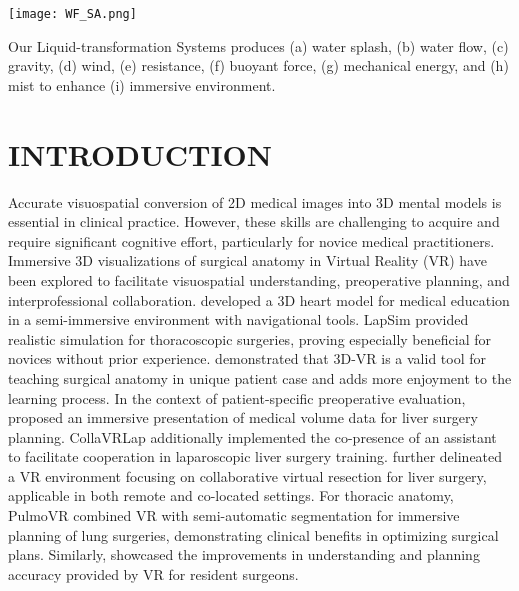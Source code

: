 \documentclass[manuscript]{acmart} %
\begin{document}

\begin{teaserfigure}
  \texttt{[image: WF\_SA.png]}
  \vspace{-1.75em}
  \caption{Our Liquid-transformation Systems produces (a) water splash, (b) water flow, (c) gravity, (d) wind,  (e) resistance, (f) buoyant force, (g) mechanical energy, and (h) mist to enhance (i) immersive environment.}
  \vspace{0.5em}
  \Description{}
  \label{fig:teaser}
\end{teaserfigure}

\maketitle

\section{INTRODUCTION}
Accurate visuospatial conversion of 2D medical images into 3D mental models is essential in clinical practice. However, these skills are challenging to acquire and require significant cognitive effort, particularly for novice medical practitioners. Immersive 3D visualizations of surgical anatomy in Virtual Reality (VR) have been explored to facilitate visuospatial understanding, preoperative planning, and interprofessional collaboration. \cite{RN86} developed a 3D heart model for medical education in a semi-immersive environment with navigational tools. LapSim \cite{RN90} provided realistic simulation for thoracoscopic surgeries, proving especially beneficial for novices without prior experience. \cite{RN95} demonstrated that 3D-VR is a valid tool for teaching surgical anatomy in unique patient case and adds more enjoyment to the learning process. In the context of patient-specific preoperative evaluation, \cite{RN83} proposed an immersive presentation of medical volume data for liver surgery planning. CollaVRLap \cite{RN26} additionally implemented the co-presence of an assistant to facilitate cooperation in laparoscopic liver surgery training. \cite{RN6} further delineated a VR environment focusing on collaborative virtual resection for liver surgery, applicable in both remote and co-located settings. For thoracic anatomy, PulmoVR \cite{RN10, RN13} combined VR with semi-automatic segmentation for immersive planning of lung surgeries, demonstrating clinical benefits in optimizing surgical plans. Similarly, \cite{RN44} showcased the improvements in understanding and planning accuracy provided by VR for resident surgeons.
 
\end{document}
